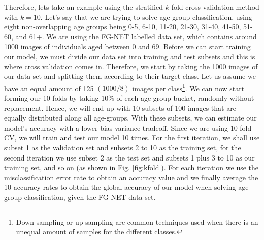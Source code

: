 Therefore, lets take an example using the stratified \(k\)-fold cross-validation method with \(k=10\). Let's say that we are trying to solve age group classification, using eight non-overlapping age groups being 0-5, 6-10, 11-20, 21-30, 31-40, 41-50, 51-60, and 61+. We are using the FG-NET labelled data set, which contains around 1000 images of individuals aged between 0 and 69. Before we can start training our model, we must divide our data set into training and test subsets and this is where cross validation comes in. Therefore, we start by taking the 1000 images of our data set and splitting them according to their target class. Let us assume we have an equal amount of 125 \((1000/8)\) images per class\footnote{Down-sampling or up-sampling are common techniques used when there is an unequal amount of samples for the different classes.}. We can now start forming our 10 folds by taking 10\% of each age-group bucket, randomly without replacement. Hence, we will end up with 10 subsets of 100 images that are equally distributed along all age-groups. With these subsets, we can estimate our model's accuracy with a lower bias-variance tradeoff. Since we are using 10-fold CV, we will train and test our model 10 times. For the first iteration, we shall use subset 1 as the validation set and subsets 2 to 10 as the training set, for the second iteration we use subset 2 as the test set and subsets 1 plus 3 to 10 as our training set, and so on (as shown in Fig. \ref{fig:kfold}). For each iteration we use the misclassification error rate to obtain an accuracy value and we finally average the 10 accuracy rates to obtain the global accuracy of our model when solving age group classification, given the FG-NET data set.

